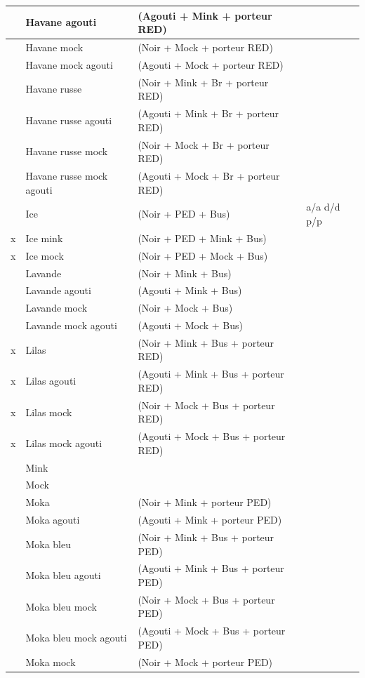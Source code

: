 ﻿\documentclass[a4paper,10pt]{article}
\begin{document}
\begin{longtable}{|c|l|l|l|}
& Havane agouti  & (Agouti + Mink + porteur   RED) & \\\hline
& Havane mock  & (Noir + Mock + porteur RED) & \\\hline
& Havane mock agouti  & (Agouti + Mock + porteur RED) & \\\hline
& Havane russe  & (Noir + Mink + Br + porteur RED) & \\\hline
& Havane russe agouti  & (Agouti + Mink + Br + porteur RED) & \\\hline
& Havane russe mock  & (Noir + Mock + Br + porteur RED) & \\\hline
& Havane russe mock agouti  & (Agouti + Mock + Br + porteur RED) & \\\hline
& Ice  & (Noir + PED + Bus) & a/a d/d p/p\\\hline
x & Ice mink  & (Noir + PED + Mink + Bus) & \\\hline
x & Ice mock  & (Noir + PED + Mock + Bus) & \\\hline
& Lavande  & (Noir + Mink + Bus) & \\\hline
& Lavande agouti & (Agouti + Mink + Bus) & \\\hline
& Lavande mock  & (Noir + Mock + Bus) & \\\hline
& Lavande mock agouti  & (Agouti + Mock + Bus) & \\\hline
x & Lilas  & (Noir + Mink + Bus + porteur RED) & \\\hline
x & Lilas agouti  & (Agouti + Mink + Bus +   porteur RED) & \\\hline
x & Lilas mock  & (Noir + Mock + Bus + porteur RED) & \\\hline
x & Lilas mock agouti  & (Agouti + Mock + Bus + porteur RED) & \\\hline
& Mink & & \\\hline
& Mock & & \\\hline
& Moka  & (Noir + Mink + porteur PED) & \\\hline
& Moka agouti  & (Agouti + Mink + porteur PED) & \\\hline
& Moka bleu  & (Noir + Mink + Bus + porteur PED) & \\\hline
& Moka bleu agouti  & (Agouti + Mink + Bus + porteur PED) & \\\hline
& Moka bleu mock  & (Noir + Mock + Bus + porteur PED) & \\\hline
& Moka bleu mock agouti  & (Agouti + Mock +   Bus + porteur PED) & \\\hline
& Moka mock  & (Noir + Mock + porteur PED) & \\\hline

\end{longtable}
\end{document}
